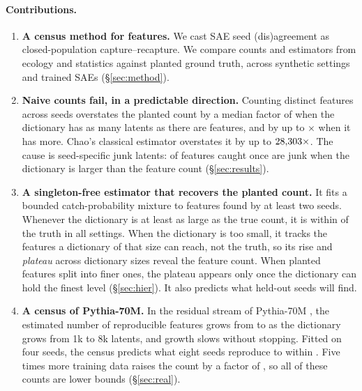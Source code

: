\paragraph{Contributions.}
\begin{enumerate}\setlength\itemsep{1pt}
\item \textbf{A census method for features.} We cast SAE seed (dis)agreement as closed-population capture--recapture. We compare \NEstimators{} counts and estimators from ecology and statistics against planted ground truth, across \SynFamilies{} synthetic settings and \SynRuns{} trained SAEs (\S\ref{sec:method}).
\item \textbf{Naive counts fail, in a predictable direction.} Counting distinct features across seeds overstates the planted count by a median factor of \UnionRatioEq{} when the dictionary has as many latents as there are features, and by up to \UnionRatioMax$\times$ when it has more. Chao's classical estimator overstates it by up to $28{,}303\times$. The cause is seed-specific junk latents: \JunkSingleOver{} of features caught once are junk when the dictionary is larger than the feature count (\S\ref{sec:results}).
\item \textbf{A singleton-free estimator that recovers the planted count.} It fits a bounded catch-probability mixture to features found by at least two seeds. Whenever the dictionary is at least as large as the true count, it is within \SfMaxErrComplete{} of the truth in all \NComplete{} settings. When the dictionary is too small, it tracks the features a dictionary of that size can reach, not the truth, so its rise and \emph{plateau} across dictionary sizes reveal the feature count. When planted features split into finer ones, the plateau appears only once the dictionary can hold the finest level (\S\ref{sec:hier}). It also predicts what held-out seeds will find.
\item \textbf{A census of Pythia-70M.} In the residual stream of Pythia-70M \citep{biderman2023pythia}, the estimated number of reproducible features grows from \RealSfOne{} to \RealSfEight{} as the dictionary grows from 1k to 8k latents, and growth slows without stopping. Fitted on four seeds, the census predicts what eight seeds reproduce to within \HeldRealSfMax. Five times more training data raises the count by a factor of \RealLongRatio{}, so all of these counts are lower bounds (\S\ref{sec:real}).
\end{enumerate}
